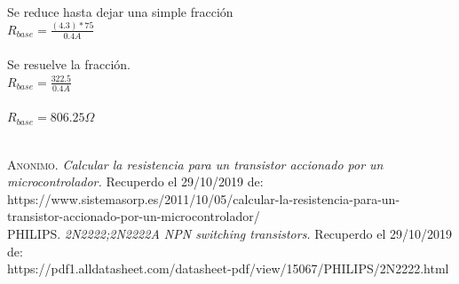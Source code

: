 \documentclass[letterpaper]{article}
\begin{document}
\begin{large}
\begin{large}
\begin{enumerate}
                Se reduce hasta dejar una simple fracción\\
                $R_{base}= \frac{(4.3)*75}{0.4A}$\\\\
                Se resuelve la fracción.\\
                $R_{base}= \frac{322.5}{0.4A}$\\\\
                $R_{base}= 806.25\Omega$\\\\
       
       
        \end{enumerate}
    \end{large}
\end{large}
\begin{thebibliography}{}
\textsc{Anonimo.} \textit{Calcular la resistencia para un transistor accionado por un microcontrolador.} Recuperdo el 29/10/2019 de:\\
https://www.sistemasorp.es/2011/10/05/calcular-la-resistencia-para-un-transistor-accionado-por-un-microcontrolador/\\
\textsc{PHILIPS.} \textit{2N2222;2N2222A NPN switching transistors.} Recuperdo el 29/10/2019 de:\\
https://pdf1.alldatasheet.com/datasheet-pdf/view/15067/PHILIPS/2N2222.html

\end{thebibliography}
\end{document}
